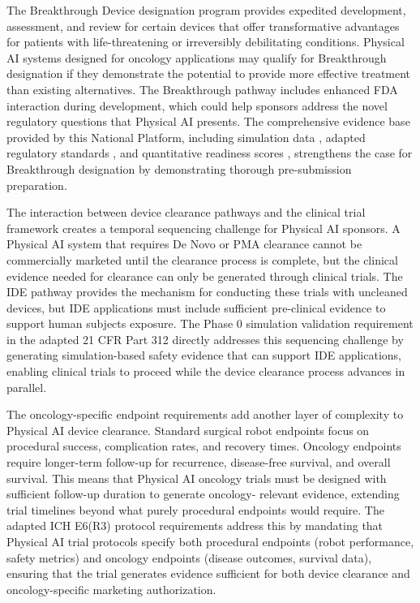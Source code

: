The Breakthrough Device designation program provides expedited development,
assessment, and review for certain devices that offer transformative
advantages for patients with life-threatening or irreversibly debilitating
conditions. Physical AI systems designed for oncology applications may
qualify for Breakthrough designation if they demonstrate the potential to
provide more effective treatment than existing alternatives. The Breakthrough
pathway includes enhanced FDA interaction during development, which could
help sponsors address the novel regulatory questions that Physical AI
presents. The comprehensive evidence base provided by this National Platform,
including simulation data \cite{site-docs}, adapted regulatory standards
\cite{ich-adapt, cfr50-adapt, cfr312-adapt}, and quantitative readiness
scores \cite{usl-standard}, strengthens the case for Breakthrough
designation by demonstrating thorough pre-submission preparation.

The interaction between device clearance pathways and the clinical trial
framework creates a temporal sequencing challenge for Physical AI sponsors.
A Physical AI system that requires De Novo or PMA clearance cannot be
commercially marketed until the clearance process is complete, but the
clinical evidence needed for clearance can only be generated through clinical
trials. The IDE pathway provides the mechanism for conducting these trials
with uncleaned devices, but IDE applications must include sufficient
pre-clinical evidence to support human subjects exposure. The Phase 0
simulation validation requirement in the adapted 21 CFR Part 312
\cite{cfr312-adapt} directly addresses this sequencing challenge by
generating simulation-based safety evidence that can support IDE applications,
enabling clinical trials to proceed while the device clearance process
advances in parallel.

The oncology-specific endpoint requirements add another layer of complexity
to Physical AI device clearance. Standard surgical robot endpoints focus on
procedural success, complication rates, and recovery times. Oncology
endpoints require longer-term follow-up for recurrence, disease-free
survival, and overall survival. This means that Physical AI oncology trials
must be designed with sufficient follow-up duration to generate oncology-
relevant evidence, extending trial timelines beyond what purely procedural
endpoints would require. The adapted ICH E6(R3) protocol requirements
\cite{ich-adapt} address this by mandating that Physical AI trial protocols
specify both procedural endpoints (robot performance, safety metrics) and
oncology endpoints (disease outcomes, survival data), ensuring that the trial
generates evidence sufficient for both device clearance and oncology-specific
marketing authorization.

